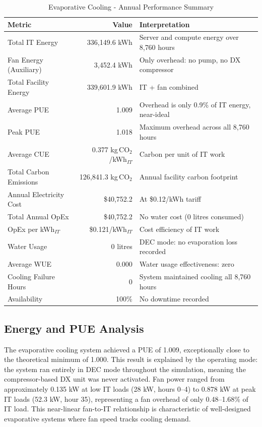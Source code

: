 ﻿\documentclass[12pt,a4paper]{report}
\begin{document}
\begin{table}[H]
\centering
\caption{Evaporative Cooling - Annual Performance Summary}
\label{tab:evap_annual}
\renewcommand{\arraystretch}{1.4}
\begin{tabular}{lrp{5.8cm}}
\toprule
\textbf{Metric} & \textbf{Value} & \textbf{Interpretation} \\
\midrule
Total IT Energy & 336{,}149.6 kWh & Server and compute energy over 8{,}760 hours \\
Fan Energy (Auxiliary) & 3{,}452.4 kWh & Only overhead: no pump, no DX compressor \\
Total Facility Energy & 339{,}601.9 kWh & IT + fan combined \\
Average PUE & 1.009 & Overhead is only 0.9\% of IT energy, near-ideal \\
Peak PUE & 1.018 & Maximum overhead across all 8{,}760 hours \\
Average CUE & 0.377 kg\,CO$_2$/kWh$_{IT}$ & Carbon per unit of IT work \\
Total Carbon Emissions & 126{,}841.3 kg\,CO$_2$ & Annual facility carbon footprint \\
Annual Electricity Cost & \$40{,}752.2 & At \$0.12/kWh tariff \\
Total Annual OpEx & \$40{,}752.2 & No water cost (0 litres consumed) \\
OpEx per kWh$_{IT}$ & \$0.121/kWh$_{IT}$ & Cost efficiency of IT work \\
Water Usage & 0 litres & DEC mode: no evaporation loss recorded \\
Average WUE & 0.000 & Water usage effectiveness: zero \\
Cooling Failure Hours & 0 & System maintained cooling all 8{,}760 hours \\
Availability & 100\% & No downtime recorded \\
\bottomrule
\end{tabular}
\end{table}

\subsection{Energy and PUE Analysis}

The evaporative cooling system achieved a PUE of 1.009, exceptionally close to the
theoretical minimum of 1.000. This result is explained by the operating mode: the system
ran entirely in DEC mode throughout the simulation, meaning the compressor-based DX unit
was never activated. Fan power ranged from approximately 0.135 kW at low IT loads (28 kW,
hours 0--4) to 0.878 kW at peak IT loads (52.3 kW, hour 35), representing a fan overhead
of only 0.48--1.68\% of IT load. This near-linear fan-to-IT relationship is characteristic
of well-designed evaporative systems where fan speed tracks cooling demand.
\end{document}
